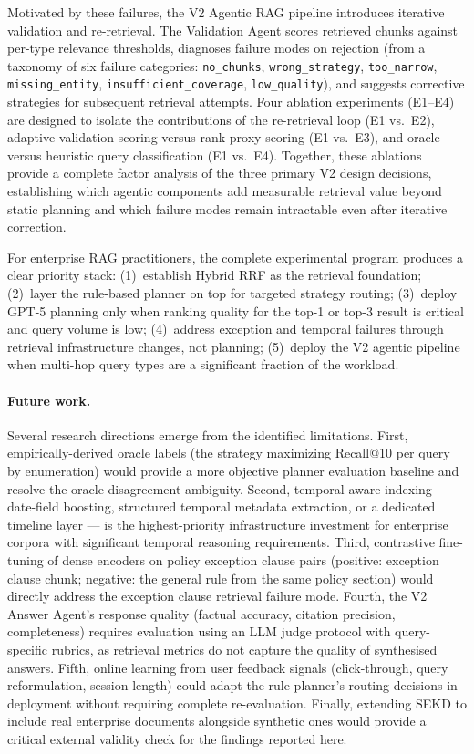 \documentclass[11pt, a4paper]{article}
\begin{document}
Motivated by these failures, the V2 Agentic RAG pipeline introduces iterative validation and re-retrieval. The Validation Agent scores retrieved chunks against per-type relevance thresholds, diagnoses failure modes on rejection (from a taxonomy of six failure categories: \texttt{no\_chunks}, \texttt{wrong\_strategy}, \texttt{too\_narrow}, \texttt{missing\_entity}, \texttt{insufficient\_coverage}, \texttt{low\_quality}), and suggests corrective strategies for subsequent retrieval attempts. Four ablation experiments (E1--E4) are designed to isolate the contributions of the re-retrieval loop (E1 vs.\ E2), adaptive validation scoring versus rank-proxy scoring (E1 vs.\ E3), and oracle versus heuristic query classification (E1 vs.\ E4). Together, these ablations provide a complete factor analysis of the three primary V2 design decisions, establishing which agentic components add measurable retrieval value beyond static planning and which failure modes remain intractable even after iterative correction.

For enterprise RAG practitioners, the complete experimental program produces a clear priority stack: (1)~establish Hybrid RRF as the retrieval foundation; (2)~layer the rule-based planner on top for targeted strategy routing; (3)~deploy GPT-5 planning only when ranking quality for the top-1 or top-3 result is critical and query volume is low; (4)~address exception and temporal failures through retrieval infrastructure changes, not planning; (5)~deploy the V2 agentic pipeline when multi-hop query types are a significant fraction of the workload.

\paragraph{Future work.} Several research directions emerge from the identified limitations. First, empirically-derived oracle labels (the strategy maximizing Recall@10 per query by enumeration) would provide a more objective planner evaluation baseline and resolve the oracle disagreement ambiguity. Second, temporal-aware indexing --- date-field boosting, structured temporal metadata extraction, or a dedicated timeline layer --- is the highest-priority infrastructure investment for enterprise corpora with significant temporal reasoning requirements. Third, contrastive fine-tuning of dense encoders on policy exception clause pairs (positive: exception clause chunk; negative: the general rule from the same policy section) would directly address the exception clause retrieval failure mode. Fourth, the V2 Answer Agent's response quality (factual accuracy, citation precision, completeness) requires evaluation using an LLM judge protocol with query-specific rubrics, as retrieval metrics do not capture the quality of synthesised answers. Fifth, online learning from user feedback signals (click-through, query reformulation, session length) could adapt the rule planner's routing decisions in deployment without requiring complete re-evaluation. Finally, extending SEKD to include real enterprise documents alongside synthetic ones would provide a critical external validity check for the findings reported here.


\end{document}
